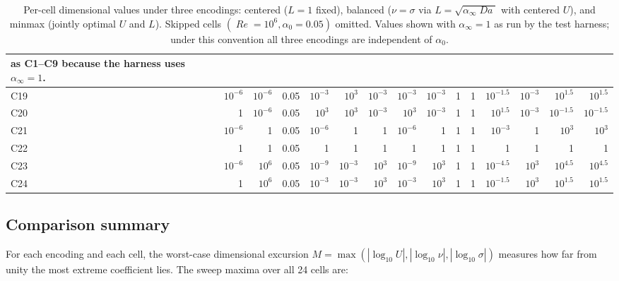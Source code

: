 \documentclass[11pt]{article}
\newcommand{\Reyn}{\operatorname{\mathit{Re}}}
\newcommand{\Damk}{\operatorname{\mathit{Da}}}
\begin{document}
\begin{table}[!htbp]
\begin{tabular}{l rrr rrr rrrr rrrr}
{{                                  as C1--C9 because the harness uses
                                  $\alpha_\infty = 1$.}} \\
    \midrule
    C19 & $10^{-6}$ & $10^{-6}$ & 0.05
        & $10^{-3}$ & $10^{3}$ & $10^{-3}$
        & $10^{-3}$ & $10^{-3}$ & 1 & 1
        & $10^{-1.5}$ & $10^{-3}$ & $10^{1.5}$ & $10^{1.5}$ \\
    C20 & 1 & $10^{-6}$ & 0.05
        & $10^{3}$ & $10^{3}$ & $10^{-3}$
        & $10^{3}$ & $10^{-3}$ & 1 & 1
        & $10^{1.5}$ & $10^{-3}$ & $10^{-1.5}$ & $10^{-1.5}$ \\
    C21 & $10^{-6}$ & 1 & 0.05
        & $10^{-6}$ & 1 & 1
        & $10^{-6}$ & 1 & 1 & 1
        & $10^{-3}$ & 1 & $10^{3}$ & $10^{3}$ \\
    C22 & 1 & 1 & 0.05
        & 1 & 1 & 1
        & 1 & 1 & 1 & 1
        & 1 & 1 & 1 & 1 \\
    C23 & $10^{-6}$ & $10^{6}$ & 0.05
        & $10^{-9}$ & $10^{-3}$ & $10^{3}$
        & $10^{-9}$ & $10^{3}$ & 1 & 1
        & $10^{-4.5}$ & $10^{3}$ & $10^{4.5}$ & $10^{4.5}$ \\
    C24 & 1 & $10^{6}$ & 0.05
        & $10^{-3}$ & $10^{-3}$ & $10^{3}$
        & $10^{-3}$ & $10^{3}$ & 1 & 1
        & $10^{-1.5}$ & $10^{3}$ & $10^{1.5}$ & $10^{1.5}$ \\
    \bottomrule
  \end{tabular}
  \caption{Per-cell dimensional values under three encodings: centered
    ($L=1$ fixed), balanced ($\nu = \sigma$ via $L = \sqrt{\alpha_\infty \Damk}$
    with centered $U$), and minmax (jointly optimal $U$ and $L$).
    Skipped cells $(\Reyn=10^{6}, \alpha_0=0.05)$ omitted. Values shown
    with $\alpha_\infty = 1$ as run by the test harness; under this
    convention all three encodings are independent of $\alpha_0$.}
  \label{tab:per-cell-varL}
\end{table}

\subsection{Comparison summary}
\label{sec:varL-comparison}

For each encoding and each cell, the worst-case dimensional excursion
$M = \max(|\log_{10} U|, |\log_{10}\nu|, |\log_{10}\sigma|)$ measures
how far from unity the most extreme coefficient lies. The sweep maxima
over all 24 cells are:
\end{document}
